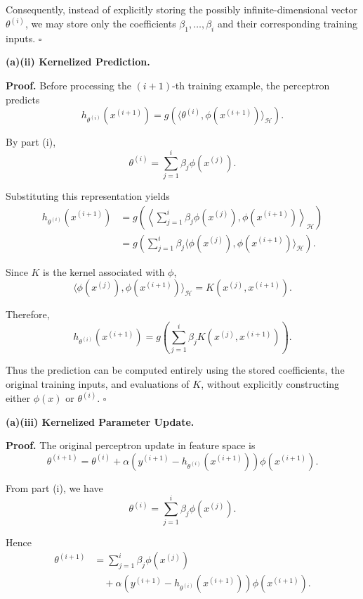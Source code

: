 \documentclass[11pt]{article}
\begin{document}
Consequently, instead of explicitly storing
the possibly infinite-dimensional vector
$\theta^{(i)}$, we may store only the
coefficients $\beta_1,\ldots,\beta_i$ and
their corresponding training inputs.
\hfill$\square$

\bigskip
\noindent\textbf{(a)(ii) Kernelized Prediction.}

\medskip
\noindent\textbf{Proof.}
Before processing the $(i+1)$-th training
example, the perceptron predicts
\[
h_{\theta^{(i)}}(x^{(i+1)})
=
g\left(
\langle\theta^{(i)},\phi(x^{(i+1)})\rangle_{\mathcal H}
\right).
\]

By part (i),
\[
\theta^{(i)}
=
\sum_{j=1}^{i}\beta_j\phi(x^{(j)}).
\]

Substituting this representation yields
\[
\begin{aligned}
h_{\theta^{(i)}}(x^{(i+1)})
&=
g\left(
\left\langle
\sum_{j=1}^{i}\beta_j\phi(x^{(j)}),
\phi(x^{(i+1)})
\right\rangle_{\mathcal H}
\right)\\
&=
g\left(
\sum_{j=1}^{i}\beta_j
\langle
\phi(x^{(j)}),\phi(x^{(i+1)})
\rangle_{\mathcal H}
\right).
\end{aligned}
\]

Since $K$ is the kernel associated with $\phi$,
\[
\langle\phi(x^{(j)}),\phi(x^{(i+1)})\rangle_{\mathcal H}
=
K(x^{(j)},x^{(i+1)}).
\]

Therefore,
\[
\boxed{
h_{\theta^{(i)}}(x^{(i+1)})
=
g\left(
\sum_{j=1}^{i}
\beta_jK(x^{(j)},x^{(i+1)})
\right).
}
\]

Thus the prediction can be computed entirely
using the stored coefficients, the original
training inputs, and evaluations of $K$,
without explicitly constructing either
$\phi(x)$ or $\theta^{(i)}$.
\hfill$\square$

\bigskip
\noindent\textbf{(a)(iii) Kernelized Parameter Update.}

\medskip
\noindent\textbf{Proof.}
The original perceptron update in feature
space is
\[
\theta^{(i+1)}
=
\theta^{(i)}
+
\alpha\left(
y^{(i+1)}
-h_{\theta^{(i)}}(x^{(i+1)})
\right)\phi(x^{(i+1)}).
\]

From part (i), we have
\[
\theta^{(i)}
=
\sum_{j=1}^{i}\beta_j\phi(x^{(j)}).
\]

Hence
\[
\begin{aligned}
\theta^{(i+1)}
&=
\sum_{j=1}^{i}\beta_j\phi(x^{(j)})\\
&\quad+
\alpha\left(
y^{(i+1)}
-h_{\theta^{(i)}}(x^{(i+1)})
\right)\phi(x^{(i+1)}).
\end{aligned}
\]
\end{document}
